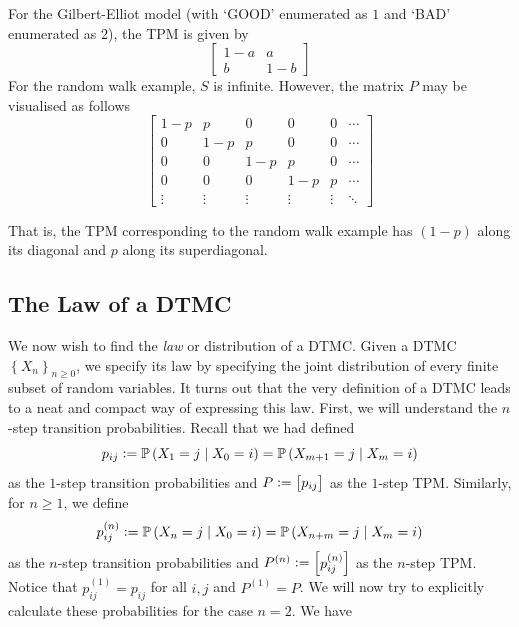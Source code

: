 \documentclass[12pt]{article}
\def\P{\mathbb{P}}
\theoremstyle{definition}
\begin{document}
For the Gilbert-Elliot model (with `GOOD' enumerated as $1$ and `BAD' enumerated as $2$), the TPM is given by 
\[
    \begin{bmatrix}
        1-a & a \\
        b & 1-b
    \end{bmatrix}
\]
For the random walk example, $S$ is infinite. However, the matrix $P$ may be visualised as follows
\[
    \begin{bmatrix}
        1-p & p & 0 & 0 & 0 & \cdots \\
        0 & 1-p & p & 0 & 0 & \cdots \\
        0 & 0 & 1-p & p & 0 & \cdots \\
        0 & 0 & 0 & 1-p & p & \cdots \\
        \vdots & \vdots & \vdots & \vdots & \vdots & \ddots
    \end{bmatrix}
\]

That is, the TPM corresponding to the random walk example has $(1-p)$ along its diagonal and $p$ along its superdiagonal.

\subsection{The Law of a DTMC}

We now wish to find the \emph{law} or distribution of a DTMC. Given a DTMC $\left\{ X_n \right\}_{n \geq 0}$, we specify its law by specifying the joint distribution of every finite subset of random variables. It turns out that the very definition of a DTMC leads to a neat and compact way of expressing this law. First, we will understand the $n$-step transition probabilities. Recall that we had defined
\[
    p_{ij} \vcentcolon= \P \left( X_1 = j \mid X_0 = i \right) = \P \left( X_{m+1} = j \mid X_m = i \right)
\]
as the $1$-step transition probabilities and $P \vcentcolon= \begin{bmatrix}
    p_{ij}
\end{bmatrix}$ as the $1$-step TPM. Similarly, for $n \geq 1$, we define
\[
    p_{ij}^{(n)} \vcentcolon= \P \left( X_n = j \mid X_0 = i \right) = \P \left( X_{n+m} = j \mid X_m = i \right)
\]
as the $n$-step transition probabilities and $P^{(n)} \vcentcolon= \begin{bmatrix}
    p_{ij}^{(n)}
\end{bmatrix}$ as the $n$-step TPM. Notice that $p_{ij}^{(1)} = p_{ij}$ for all $i,j$ and $P^{(1)} = P$. We will now try to explicitly calculate these probabilities for the case $n=2$. We have
\end{document}
